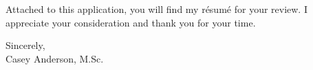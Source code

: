 \begin{center}
\begin{minipage}{\textwidth}
  \vspace{3mm}

  Attached to this application, you will find my r\'{e}sum\'{e} for your review. 
  I appreciate your consideration and thank you for your time.

  
  \vspace{6mm}
  
  Sincerely, \\ 
  
  
  Casey Anderson, M.Sc.
  
  \end{minipage}
\end{center}


